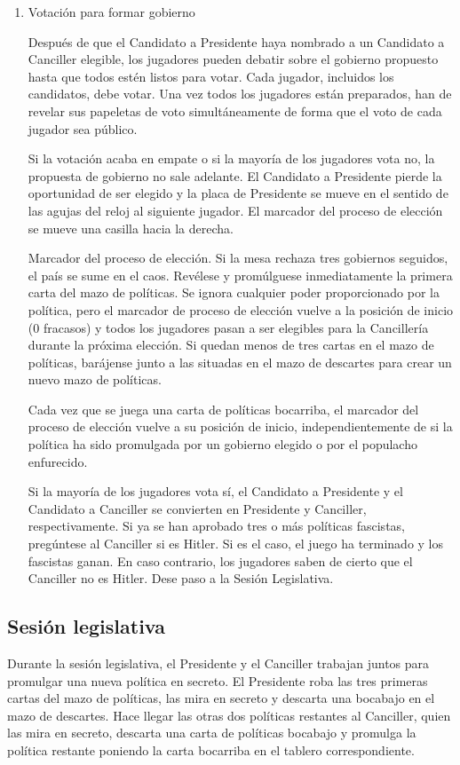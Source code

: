 \documentclass[13pt,a4paper,twocolumn,titlepage]{scrartcl}
\begin{document}
\begin{enumerate}
		\item \textcolor{Blue3}{Votación para formar gobierno}
		
		Después de que el Candidato a Presidente haya nombrado a un Candidato a Canciller elegible, los jugadores pueden debatir sobre el gobierno propuesto hasta que todos estén listos para votar. Cada jugador, incluidos los candidatos, debe votar. Una vez todos los jugadores están preparados, han de revelar sus papeletas de voto simultáneamente de forma que el voto de cada jugador sea público.
		
		\textcolor{Blue3}{Si la votación acaba en empate o si la mayoría de los jugadores vota no,} la propuesta de gobierno no sale adelante. El Candidato a Presidente pierde la oportunidad de ser elegido y la placa de Presidente se mueve en el sentido de las agujas del reloj al siguiente jugador. El marcador del proceso de elección se mueve una casilla hacia la derecha.
		
		\textcolor{Blue3}{Marcador del proceso de elección.} Si la mesa rechaza tres gobiernos seguidos, el país se sume en el caos. Revélese y promúlguese inmediatamente la primera carta del mazo de políticas. Se ignora cualquier poder proporcionado por la política, pero el marcador de proceso de elección vuelve a la posición de inicio (0 fracasos) y todos los jugadores pasan a ser elegibles para la Cancillería durante la próxima elección. Si quedan menos de tres cartas en el mazo de políticas, barájense junto a las situadas en el mazo de descartes para crear un nuevo mazo de políticas.
		
		Cada vez que se juega una carta de políticas bocarriba, el marcador del proceso de elección vuelve a su posición de inicio, independientemente de si la política ha sido promulgada por un gobierno elegido o por el populacho enfurecido.
		
		\textcolor{Blue3}{Si la mayoría de los jugadores vota sí,}​ el Candidato a Presidente y el Candidato a Canciller se convierten en Presidente y Canciller, respectivamente. \textcolor{Blue3}{Si ya se han aprobado tres o más políticas fascistas,} pregúntese al Canciller si es \textcolor{fascist}{Hitler}. Si es el caso, el juego ha terminado y los \textcolor{fascist}{fascistas} ganan. En caso contrario, los jugadores saben de cierto que el Canciller no es \textcolor{fascist}{Hitler}. Dese paso a la Sesión Legislativa.
	\end{enumerate}
	
	\subsection*{Sesión legislativa}
	Durante la sesión legislativa, el Presidente y el Canciller trabajan juntos para promulgar una nueva política en secreto. El Presidente roba las tres primeras cartas del mazo de políticas, las mira en secreto y descarta una bocabajo en el mazo de descartes. Hace llegar las otras dos políticas restantes al Canciller, quien las mira en secreto, descarta una carta de políticas bocabajo y promulga la política restante poniendo la carta bocarriba en el tablero correspondiente. 
	
\end{document}
